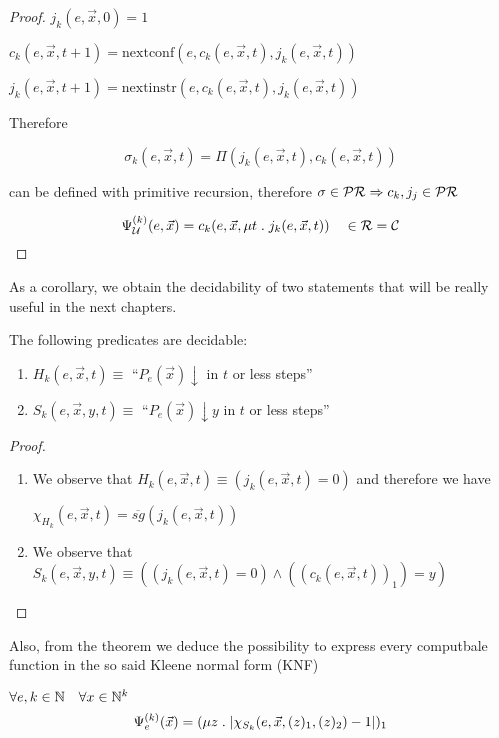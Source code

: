 \begin{theorem}
\begin{proof}
  $j_k(e, \vec{x}, 0) = 1$

  $c_k(e, \vec{x}, t+1) = \mbox{nextconf} (e, c_k(e, \vec{x}, t), j_k(e,\vec{x},t))$

  $j_k(e, \vec{x}, t+1) = \mbox{nextinstr} (e, c_k(e, \vec{x}, t), j_k(e,\vec{x},t))$

  Therefore

  \[
    \sigma_k(e,\vec{x},t) = \Pi(j_k(e,\vec{x},t), c_k(e,\vec{x},t))
  \]

  can be defined with primitive recursion, therefore $\sigma \in \mathcal{PR} \Rightarrow c_k, j_j \in \mathcal{PR}$

  \[
    \Psi_{\mathcal{U}}^{(k)} (e, \vec{x}) = c_k(e, \vec{x}, \mu t \; . \; j_k(e,\vec{x},t)) \quad \in \mathcal{R} = \mathcal{C}
  \]
  \end{proof}
\end{theorem}

As a corollary, we obtain the decidability of two statements that will
be really useful in the next chapters.

\begin{corollary}
  The following predicates are decidable:
  \begin{enumerate}[label=(\alph*)]
  \item $H_k(e, \vec{x}, t) \equiv$ ``$P_e(\vec{x})\downarrow$ in $t$
    or less steps''
  \item $S_k(e, \vec{x}, y, t) \equiv$ ``$P_e(\vec{x})\downarrow y$ in
    $t$ or less steps''
  \end{enumerate}
  \begin{proof}
    \begin{enumerate}[label=(\alph*)]
    \item We observe that
      $H_k(e, \vec{x}, t) \equiv (j_k(e,\vec{x}, t) = 0)$ and therefore
      we have
      
      $\chi_{H_k}(e, \vec{x}, t) = \overline{sg}(j_k(e,\vec{x},t))$
    \item We observe that
      $S_k(e, \vec{x}, y, t) \equiv ((j_k(e,\vec{x},t) = 0) \wedge ((c_k(e,\vec{x},t))_1)=y)$
    \end{enumerate}
  \end{proof}
\end{corollary}

Also, from the theorem we deduce the possibility to express every
computbale function in the so said Kleene normal form (KNF)

\begin{corollary}
  $\forall e,k \in \mathbb{N} \quad \forall x \in \mathbb{N}^k$
  \[
    \Psi_e^{(k)} (\vec{x}) = (\mu z \;.\; |\chi_{S_k}(e, \vec{x}, (z)_1, (z)_2) - 1|)_1
  \]
\end{corollary}

